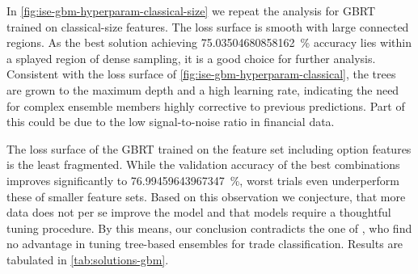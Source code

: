 In \cref{fig:ise-gbm-hyperparam-classical-size} we repeat the analysis for \gls{GBRT} trained on classical-size features. The loss surface is smooth with large connected regions. As the best solution achieving \SI{75.03504680858162}{\percent} accuracy lies within a splayed region of dense sampling, it is a good choice for further analysis. Consistent with the loss surface of \cref{fig:ise-gbm-hyperparam-classical}, the trees are grown to the maximum depth and a high learning rate, indicating the need for complex ensemble members highly corrective to previous predictions. Part of this could be due to the low signal-to-noise ratio in financial data.

The loss surface of the \gls{GBRT} trained on the feature set including option features is the least fragmented. While the validation accuracy of the best combinations improves significantly to \SI{76.99459643967347}{\percent}, worst trials even underperform these of smaller feature sets. Based on this observation we conjecture, that more data does not per se improve the model and that models require a thoughtful tuning procedure. By this means, our conclusion contradicts the one of \textcite[][14]{ronenMachineLearningTrade2022}, who find no advantage in tuning tree-based ensembles for trade classification. Results are tabulated in \cref{tab:solutions-gbm}.

